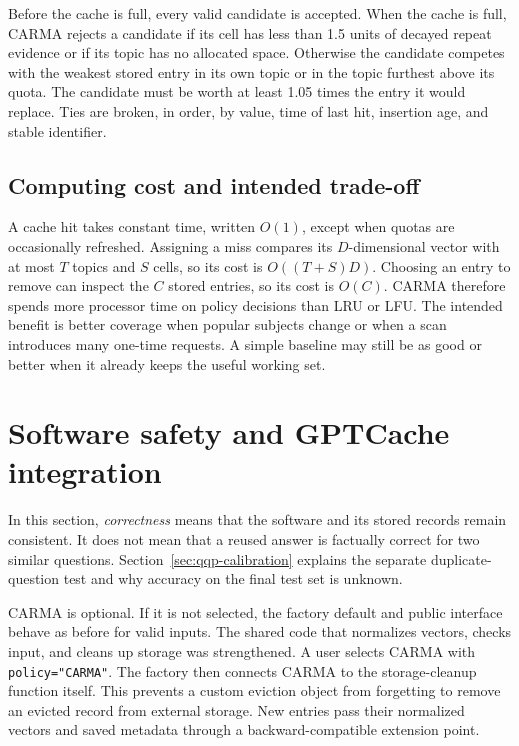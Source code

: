 \documentclass[10pt,letterpaper]{article}
\newcommand{\code}[1]{\texttt{#1}}
\begin{document}
Before the cache is full, every valid candidate is accepted. When the cache is
full, CARMA rejects a candidate if its cell has less than 1.5 units of decayed
repeat evidence or if its topic has no allocated space. Otherwise the
candidate competes with the weakest stored entry in its own topic or in the
topic furthest above its quota. The candidate must be worth at least 1.05 times
the entry it would replace. Ties are broken, in order, by value, time of last
hit, insertion age, and stable identifier.

\subsection{Computing cost and intended trade-off}

A cache hit takes constant time, written $O(1)$, except when quotas are
occasionally refreshed. Assigning a miss compares its $D$-dimensional vector
with at most $T$ topics and $S$ cells, so its cost is $O((T+S)D)$. Choosing an
entry to remove can inspect the $C$ stored entries, so its cost is $O(C)$.
CARMA therefore spends more processor time on policy decisions than LRU or
LFU. The intended benefit is better coverage when popular subjects change or
when a scan introduces many one-time requests. A simple baseline may still be
as good or better when it already keeps the useful working set.

\section{Software safety and GPTCache integration}

In this section, \emph{correctness} means that the software and its stored
records remain consistent. It does not mean that a reused answer is factually
correct for two similar questions. Section~\ref{sec:qqp-calibration} explains
the separate duplicate-question test and why accuracy on the final test set is
unknown.

CARMA is optional. If it is not selected, the factory default and public
interface behave as before for valid inputs. The shared code that normalizes
vectors, checks input, and cleans up storage was strengthened. A user selects
CARMA with \code{policy="CARMA"}. The factory then connects CARMA to the
storage-cleanup function itself. This prevents a custom eviction object from
forgetting to remove an evicted record from external storage. New entries pass
their normalized vectors and saved metadata through a backward-compatible
extension point.
\end{document}
